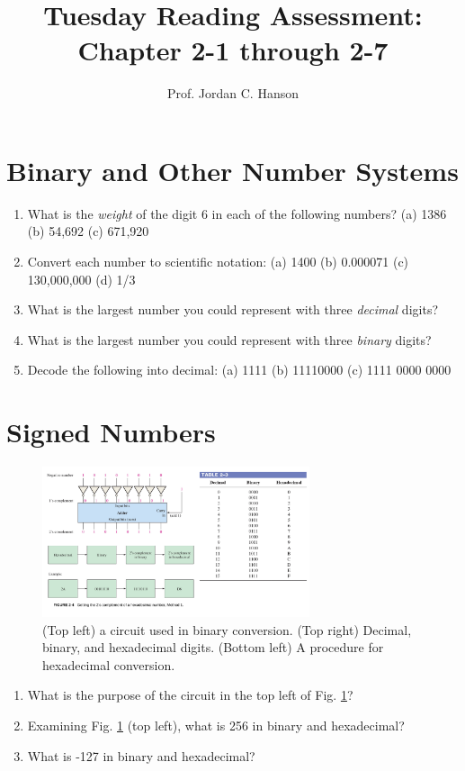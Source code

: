 \documentclass{article}
\begin{document}
\title{Tuesday Reading Assessment: Chapter 2-1 through 2-7}
\author{Prof. Jordan C. Hanson}

\maketitle

\section{Binary and Other Number Systems}

\begin{enumerate}
\item What is the \textit{weight} of the digit 6 in each of the following numbers? (a) 1386 (b) 54,692 (c) 671,920 \\ \vspace{0.2cm}
\item Convert each number to scientific notation: (a) 1400 (b) 0.000071 (c) 130,000,000 (d) 1/3 \\ \vspace{0.2cm}
\item What is the largest number you could represent with three \textit{decimal} digits?
\item What is the largest number you could represent with three \textit{binary} digits?
\item Decode the following into decimal: (a) 1111 (b) 11110000 (c) 1111 0000 0000 \\ \vspace{0.2cm}
\end{enumerate}

\section{Signed Numbers}

\begin{figure}[hb]
\centering
\includegraphics[width=0.7\textwidth]{figures/quiz_graphic.pdf}
\caption{\label{fig:quiz}(Top left) a circuit used in binary conversion. (Top right) Decimal, binary, and hexadecimal digits. (Bottom left) A procedure for hexadecimal conversion.}
\end{figure}

\begin{enumerate}
\item What is the purpose of the circuit in the top left of Fig. \ref{fig:quiz}?
\item Examining Fig. \ref{fig:quiz} (top left), what is 256 in binary and hexadecimal?
\item What is -127 in binary and hexadecimal?
\end{enumerate}
\end{document}
